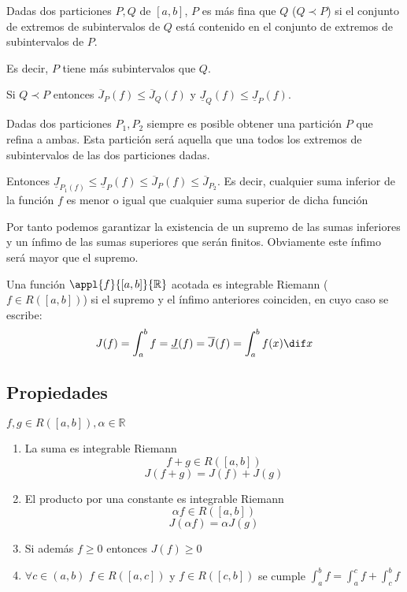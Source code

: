\documentclass{apuntes}
\begin{document}
\begin{defn}[Finura]
Dadas dos particiones $P,Q$ de $[a,b]$, $P$ es más fina que $Q$ ($Q\prec P$) si el conjunto de extremos de subintervalos de $Q$ está contenido en el conjunto de extremos de subintervalos de $P$.

Es decir, $P$ tiene más subintervalos que $Q$.
\end{defn}

Si $Q\prec P$ entonces $\overline{J}_P(f) \leq \overline{J}_Q(f)$ y $\underline{J}_Q(f) \leq \underline{J}_P(f)$.

Dadas dos particiones $P_1,P_2$ siempre es posible obtener una partición $P$ que refina a ambas. Esta partición será aquella que una todos los extremos de subintervalos de las dos particiones dadas.

Entonces $\underline{J}_{P_1(f)} \leq \underline{J}_P(f) \leq \overline{J}_P(f) \leq \overline{J}_{P_2}$. Es decir, cualquier suma inferior de la función $f$ es menor o igual que cualquier suma superior de dicha función

Por tanto podemos garantizar la existencia de un supremo de las sumas inferiores y un ínfimo de las sumas superiores que serán finitos. Obviamente este ínfimo será mayor que el supremo.

\begin{defn}
Una función $\appl{f}{[a,b]}{\mathbb{R}}$ acotada es integrable Riemann ($f \in R([a,b])$) si el supremo y el ínfimo anteriores coinciden, en cuyo caso se escribe:
\[ J(f) = \int_a^b f = \underline{J}(f) = \overline{J}(f) = \int_a^b f(x) \dif x \]
\end{defn}

\subsection{Propiedades}
$f,g \in R([a,b]), \alpha \in \mathbb{R}$
\begin{enumerate}
\item La suma es integrable Riemann
\[f + g \in R([a,b])\]\[ J(f+g) = J(f) + J(g)\]
\item El producto por una constante es integrable Riemann
\[\alpha f \in R([a,b])\] \[ J(\alpha f) = \alpha J(g)\]
\item Si además $f\geq 0$ entonces $J(f)\geq 0$
\item $\forall c \in (a,b)$ $f\in R([a,c])$  y $f\in R([c,b])$ se cumple
$\int_a^b f = \int_a^c f + \int_c^b f$
\end{enumerate}
\end{document}
